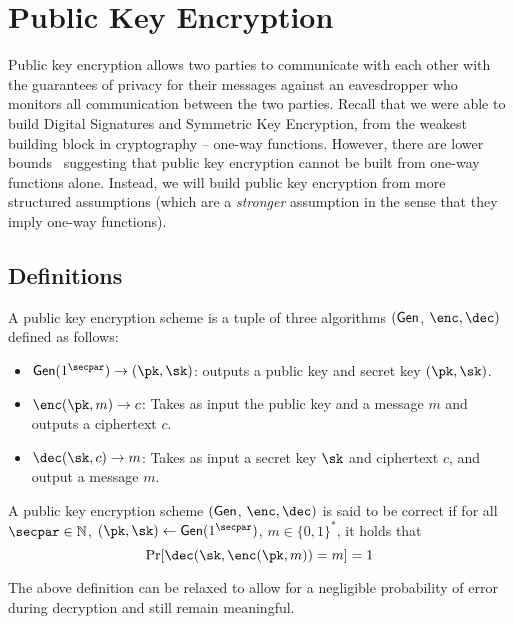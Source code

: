 \chapter{Public Key Encryption}
Public key encryption allows two parties
to communicate with each other with the guarantees of privacy for their messages against an eavesdropper who monitors all communication between the two parties. Recall that we were able to build Digital Signatures and Symmetric Key Encryption, from the weakest building block in cryptography -- one-way functions. However, there are lower bounds~\cite{STOC:ImpRud89} suggesting that public key encryption cannot be built from one-way functions alone. Instead, we will build public key encryption from more structured assumptions (which are a \emph{stronger} assumption in the sense that they imply one-way functions).

\section{Definitions}
\begin{definition}
    A public key encryption scheme is a tuple of three algorithms $(\mathsf{Gen}$, $\enc, \dec)$ defined as follows:
    \begin{itemize}
        \item $\gen(1^\secpar) \to (\pk, \sk)$: outputs a public key and secret key $(\pk, \sk)$.

        \item $\enc(\pk, m) \to c$: Takes as input the public key and a message $m$ and outputs a ciphertext $c$.

        \item $\dec(\sk, c) \to m$: Takes as input a secret key $\sk$ and ciphertext $c$, and output a message $m$.
    \end{itemize}
\end{definition}

\begin{definition}
    A public key encryption scheme $(\mathsf{Gen}$, $\enc, \dec)$ is said to be correct if for all $\secpar \in \mathbb{N}$, $(\pk, \sk) \gets \gen(1^\secpar)$, $m \in \{0,1\}^*$, it holds that
    \[\Pr[\dec(\sk, \enc(\pk, m)) = m] = 1\]
\end{definition}
The above definition can be relaxed to allow for a negligible probability of error during decryption and still remain meaningful.

